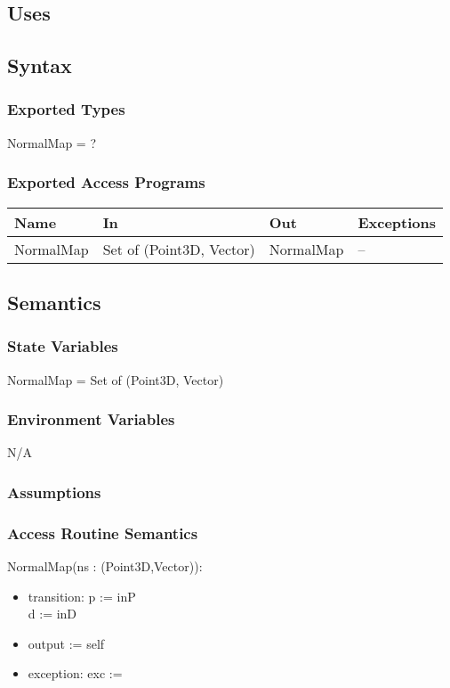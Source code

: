 \documentclass[12pt, titlepage]{article}
\begin{document}
\subsection{Uses}

\subsection{Syntax}
\subsubsection{Exported Types}
NormalMap = ?

\subsubsection{Exported Access Programs}
\begin{center}
	\begin{tabular}{p{3cm} p{4cm} p{2cm} p{4cm}}
		\hline
		\textbf{Name} & \textbf{In} & \textbf{Out} & \textbf{Exceptions} \\
		\hline
		NormalMap & Set of (Point3D, Vector) & NormalMap & -- \\
		\hline
	\end{tabular}
\end{center}

\subsection{Semantics}
\subsubsection{State Variables}
NormalMap = Set of (Point3D, Vector)

\subsubsection{Environment Variables}
N/A

\subsubsection{Assumptions}


\subsubsection{Access Routine Semantics}
\noindent NormalMap(ns : (Point3D,Vector)):
\begin{itemize}
	\item transition: p := inP \\
	d := inD
	\item output := self
	\item exception: exc :=
\end{itemize}
\end{document}

